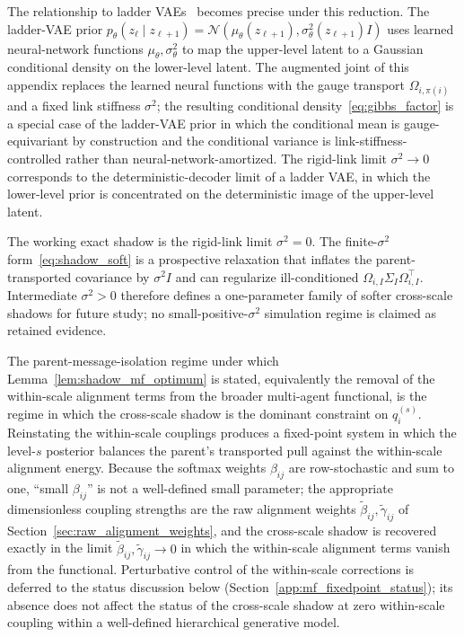 \documentclass[11pt]{article}
\begin{document}
The relationship to ladder VAEs~\cite{Sonderby2016} becomes precise under this reduction. The ladder-VAE prior $p_\theta(z_\ell \mid z_{\ell+1}) = \mathcal{N}(\mu_\theta(z_{\ell+1}), \sigma^2_\theta(z_{\ell+1}) I)$ uses learned neural-network functions $\mu_\theta, \sigma^2_\theta$ to map the upper-level latent to a Gaussian conditional density on the lower-level latent. The augmented joint of this appendix replaces the learned neural functions with the gauge transport $\Omega_{i,\pi(i)}$ and a fixed link stiffness $\sigma^2$; the resulting conditional density~\eqref{eq:gibbs_factor} is a special case of the ladder-VAE prior in which the conditional mean is gauge-equivariant by construction and the conditional variance is link-stiffness-controlled rather than neural-network-amortized. The rigid-link limit $\sigma^2 \to 0$ corresponds to the deterministic-decoder limit of a ladder VAE, in which the lower-level prior is concentrated on the deterministic image of the upper-level latent.

The working exact shadow is the rigid-link limit $\sigma^2=0$. The finite-$\sigma^2$ form~\eqref{eq:shadow_soft} is a prospective relaxation that inflates the parent-transported covariance by $\sigma^2 I$ and can regularize ill-conditioned $\Omega_{i,I}\Sigma_I\Omega_{i,I}^\top$. Intermediate $\sigma^2 > 0$ therefore defines a one-parameter family of softer cross-scale shadows for future study; no small-positive-$\sigma^2$ simulation regime is claimed as retained evidence.

The parent-message-isolation regime under which Lemma~\ref{lem:shadow_mf_optimum} is stated, equivalently the removal of the within-scale alignment terms from the broader multi-agent functional, is the regime in which the cross-scale shadow is the dominant constraint on $q_i^{(s)}$. Reinstating the within-scale couplings produces a fixed-point system in which the level-$s$ posterior balances the parent's transported pull against the within-scale alignment energy. Because the softmax weights $\beta_{ij}$ are row-stochastic and sum to one, ``small $\beta_{ij}$'' is not a well-defined small parameter; the appropriate dimensionless coupling strengths are the raw alignment weights $\tilde\beta_{ij}, \tilde\gamma_{ij}$ of Section~\ref{sec:raw_alignment_weights}, and the cross-scale shadow is recovered exactly in the limit $\tilde\beta_{ij}, \tilde\gamma_{ij} \to 0$ in which the within-scale alignment terms vanish from the functional. Perturbative control of the within-scale corrections is deferred to the status discussion below (Section~\ref{app:mf_fixedpoint_status}); its absence does not affect the status of the cross-scale shadow at zero within-scale coupling within a well-defined hierarchical generative model.
\end{document}
